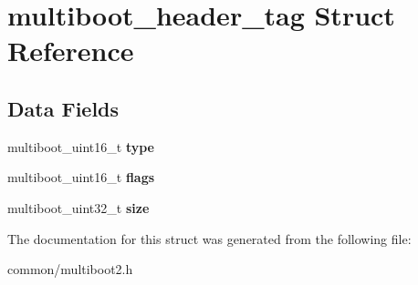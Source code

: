 \hypertarget{structmultiboot__header__tag}{}\section{multiboot\+\_\+header\+\_\+tag Struct Reference}
\label{structmultiboot__header__tag}
\subsection*{Data Fields}
\begin{DoxyCompactItemize}
\item 
multiboot\+\_\+uint16\+\_\+t {\bfseries type}\hypertarget{structmultiboot__header__tag_a90c251eba44eb91071ab060a390e6207}{}\label{structmultiboot__header__tag_a90c251eba44eb91071ab060a390e6207}

\item 
multiboot\+\_\+uint16\+\_\+t {\bfseries flags}\hypertarget{structmultiboot__header__tag_af24fe7df075c5603681a6cbbb26c2e07}{}\label{structmultiboot__header__tag_af24fe7df075c5603681a6cbbb26c2e07}

\item 
multiboot\+\_\+uint32\+\_\+t {\bfseries size}\hypertarget{structmultiboot__header__tag_af101417fafcaa5265b691c205d9759df}{}\label{structmultiboot__header__tag_af101417fafcaa5265b691c205d9759df}

\end{DoxyCompactItemize}


The documentation for this struct was generated from the following file\+:\begin{DoxyCompactItemize}
\item 
common/multiboot2.\+h\end{DoxyCompactItemize}
